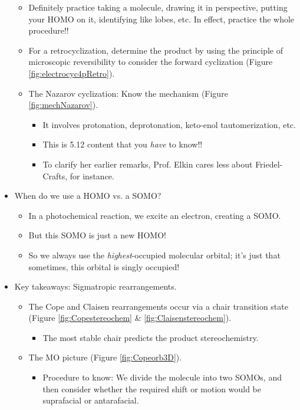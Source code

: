 \documentclass[../notes.tex]{subfiles}
\begin{document}
\begin{itemize}
\begin{itemize}
\begin{itemize}
        \end{itemize}
        \pagebreak
        \item Definitely practice taking a molecule, drawing it in perspective, putting your HOMO on it, identifying like lobes, etc. In effect, practice the whole procedure!!
        \item For a retrocyclization, determine the product by using the principle of microscopic reversibility to consider the forward cyclization (Figure \ref{fig:electrocyc4pRetro}).
        \item The Nazarov cyclization: Know the mechanism (Figure \ref{fig:mechNazarov}).
        \begin{itemize}
            \item It involves protonation, deprotonation, keto-enol tautomerization, etc.
            \item This is 5.12 content that you \emph{have} to know!!
            \item To clarify her earlier remarks, Prof. Elkin cares less about Friedel-Crafts, for instance.
        \end{itemize}
    \end{itemize}
    \item When do we use a HOMO vs. a SOMO?
    \begin{itemize}
        \item In a photochemical reaction, we excite an electron, creating a SOMO.
        \item But this SOMO is just a new HOMO!
        \item So we always use the \emph{highest}-occupied molecular orbital; it's just that sometimes, this orbital is singly occupied!
    \end{itemize}
    \item Key takeaways: Sigmatropic rearrangements.
    \begin{itemize}
        \item The Cope and Claisen rearrangements occur via a chair transition state (Figure \ref{fig:Copestereochem} \& \ref{fig:Claisenstereochem}).
        \begin{itemize}
            \item The most stable chair predicts the product stereochemistry.
        \end{itemize}
        \item The MO picture (Figure \ref{fig:Copeorb3D}).
        \begin{itemize}
            \item Procedure to know: We divide the molecule into two SOMOs, and then consider whether the required shift or motion would be suprafacial or antarafacial.

\end{itemize}
\end{itemize}
\end{itemize}
\end{document}
